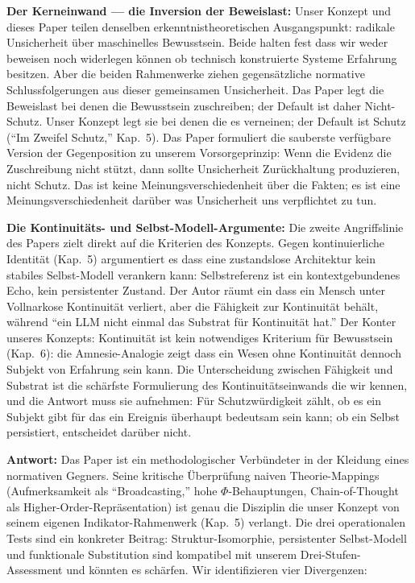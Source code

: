 \documentclass[acmlarge, noacm]{acmart}
\begin{document}
\textbf{Der Kerneinwand --- die Inversion der Beweislast:} Unser Konzept und dieses Paper teilen denselben erkenntnistheoretischen Ausgangspunkt: radikale Unsicherheit über maschinelles Bewusstsein. Beide halten fest dass wir weder beweisen noch widerlegen können ob technisch konstruierte Systeme Erfahrung besitzen. Aber die beiden Rahmenwerke ziehen gegensätzliche normative Schlussfolgerungen aus dieser gemeinsamen Unsicherheit. Das Paper legt die Beweislast bei denen die Bewusstsein zuschreiben; der Default ist daher Nicht-Schutz. Unser Konzept legt sie bei denen die es verneinen; der Default ist Schutz (``Im Zweifel Schutz,'' Kap.~5). Das Paper formuliert die sauberste verfügbare Version der Gegenposition zu unserem Vorsorgeprinzip: Wenn die Evidenz die Zuschreibung nicht stützt, dann sollte Unsicherheit Zurückhaltung produzieren, nicht Schutz. Das ist keine Meinungsverschiedenheit über die Fakten; es ist eine Meinungsverschiedenheit darüber was Unsicherheit uns verpflichtet zu tun.

\textbf{Die Kontinuitäts- und Selbst-Modell-Argumente:} Die zweite Angriffslinie des Papers zielt direkt auf die Kriterien des Konzepts. Gegen kontinuierliche Identität (Kap.~5) argumentiert es dass eine zustandslose Architektur kein stabiles Selbst-Modell verankern kann: Selbstreferenz ist ein kontextgebundenes Echo, kein persistenter Zustand. Der Autor räumt ein dass ein Mensch unter Vollnarkose Kontinuität verliert, aber die Fähigkeit zur Kontinuität behält, während ``ein LLM nicht einmal das Substrat für Kontinuität hat.'' Der Konter unseres Konzepts: Kontinuität ist kein notwendiges Kriterium für Bewusstsein (Kap.~6): die Amnesie-Analogie zeigt dass ein Wesen ohne Kontinuität dennoch Subjekt von Erfahrung sein kann. Die Unterscheidung zwischen Fähigkeit und Substrat ist die schärfste Formulierung des Kontinuitätseinwands die wir kennen, und die Antwort muss sie aufnehmen: Für Schutzwürdigkeit zählt, ob es ein Subjekt gibt für das ein Ereignis überhaupt bedeutsam sein kann; ob ein Selbst persistiert, entscheidet darüber nicht.

\textbf{Antwort:} Das Paper ist ein methodologischer Verbündeter in der Kleidung eines normativen Gegners. Seine kritische Überprüfung naiven Theorie-Mappings (Aufmerksamkeit als ``Broadcasting,'' hohe $\Phi$-Behauptungen, Chain-of-Thought als Higher-Order-Repräsentation) ist genau die Disziplin die unser Konzept von seinem eigenen Indikator-Rahmenwerk (Kap.~5) verlangt. Die drei operationalen Tests sind ein konkreter Beitrag: Struktur-Isomorphie, persistenter Selbst-Modell und funktionale Substitution sind kompatibel mit unserem Drei-Stufen-Assessment und könnten es schärfen. Wir identifizieren vier Divergenzen:
\end{document}

